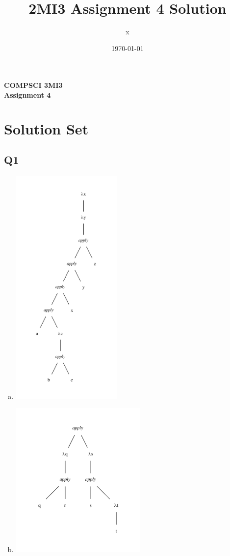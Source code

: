 \documentclass[12pt, fleqn]{article}
\title{2MI3 Assignment 4 Solution}
\author{x}
\date{\today}
\begin{document}
\begin{center}

    {\large \textbf{COMPSCI 3MI3}}\\[8mm]
    {\huge \textbf{Assignment 4}}\\[6mm]
  
\end{center}

\section{Solution Set}

\subsection{Q1}

\begin{enumerate}[(a)]
    \item
    \begin{center}
        \includegraphics[width=0.43\textwidth]{a1.pdf}
    \end{center}

    \item
    \begin{center}
        \includegraphics[width=0.53\textwidth]{b1.pdf}
    \end{center}
    

\end{enumerate}
\end{document}
